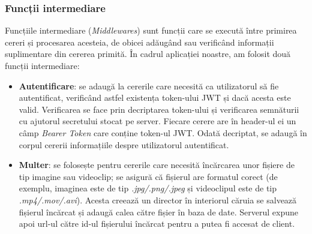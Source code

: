 \subsubsection{Funcții intermediare}
Funcțiile intermediare (\textit{Middlewares}) sunt funcții care se execută între primirea cereri
și procesarea acesteia, de obicei adăugând sau verificând informații suplimentare din cererea
primită. În cadrul aplicației noastre, am folosit două funcții intermediare:
\begin{itemize}
    \item \textbf{Autentificare}: se adaugă la cererile care necesită ca utilizatorul să fie
    autentificat, verificând astfel existența token-ului JWT și dacă acesta este valid. Verificarea
    se face prin decriptarea token-ului și verificarea semnăturii cu ajutorul secretului stocat
    pe server. Fiecare cerere are în header-ul ei un câmp \textit{Bearer Token} care conține
    token-ul JWT. Odată decriptat, se adaugă în corpul cererii informațiile despre
    utilizatorul autentificat.
    \item \textbf{Multer}: se folosește pentru cererile care necesită încărcarea unor
    fișiere de tip imagine sau videoclip; se asigură că fișierul are formatul corect
    (de exemplu, imaginea este de tip \textit{.jpg/.png/.jpeg} și videoclipul este de tip \textit{.mp4/.mov/.avi}).
    Acesta creează un director în interiorul căruia se salvează fișierul încărcat și adaugă
    calea către fișier în baza de date. Serverul expune apoi url-ul către id-ul fișierului
    încărcat pentru a putea fi accesat de client.
    
\end{itemize}

